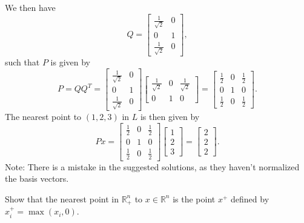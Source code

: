 \begin{solution}
  We then have
  \begin{equation}
    Q =
    \begin{bmatrix}
      \frac{1}{\sqrt{2}} & 0 \\
      0 & 1 \\
      \frac{1}{\sqrt{2}} & 0
    \end{bmatrix},
  \end{equation}
  such that $P$ is given by
  \begin{equation}
    P = Q Q^T =
    \begin{bmatrix}
      \frac{1}{\sqrt{2}} & 0 \\
      0 & 1 \\
      \frac{1}{\sqrt{2}} & 0
    \end{bmatrix}
    \begin{bmatrix}
      \frac{1}{\sqrt{2}} & 0 & \frac{1}{\sqrt{2}} \\
      0 & 1 & 0
    \end{bmatrix} =
    \begin{bmatrix}
      \frac{1}{2} & 0 & \frac{1}{2} \\
      0 & 1 & 0 \\
      \frac{1}{2} & 0 & \frac{1}{2}
    \end{bmatrix}.
  \end{equation}
  The nearest point to $(1, 2, 3)$ in $L$ is then given by
  \begin{equation}
    P x =
    \begin{bmatrix}
      \frac{1}{2} & 0 & \frac{1}{2} \\
      0 & 1 & 0 \\
      \frac{1}{2} & 0 & \frac{1}{2}
    \end{bmatrix}
    \begin{bmatrix}
      1 \\
      2 \\
      3
    \end{bmatrix} =
    \begin{bmatrix}
      2 \\
      2 \\
      2
    \end{bmatrix}.
  \end{equation}
  Note: There is a mistake in the suggested solutions, as they haven't normalized the basis vectors.
\end{solution}

\begin{exercise}
  Show that the nearest point in $\mathbb{R}^n_+$ to $x \in \mathbb{R}^n$ is the point $x^+$ defined by $x^+_i = \max(x_i, 0)$.
\end{exercise}

